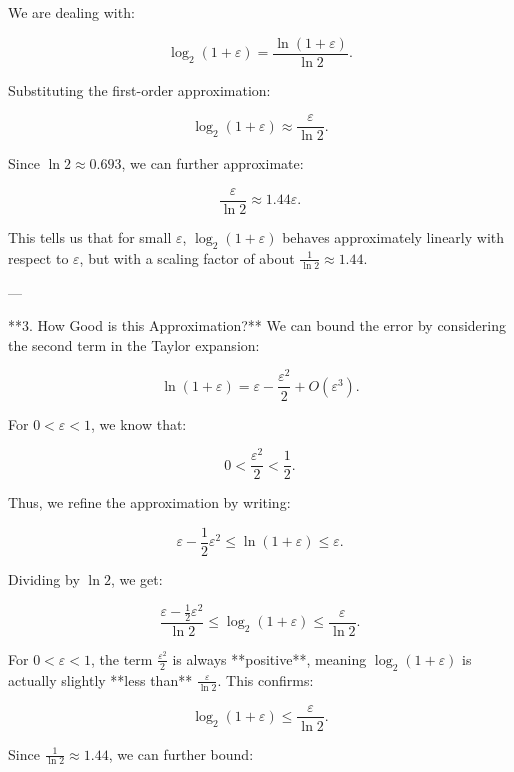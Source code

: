 {       We are dealing with:
       
       \[
       \log_2(1+\varepsilon) = \frac{\ln(1+\varepsilon)}{\ln 2}.
       \]
       
       Substituting the first-order approximation:
       
       \[
       \log_2(1+\varepsilon) \approx \frac{\varepsilon}{\ln 2}.
       \]
       
       Since \( \ln 2 \approx 0.693 \), we can further approximate:
       
       \[
       \frac{\varepsilon}{\ln 2} \approx 1.44 \varepsilon.
       \]
       
       This tells us that for small \( \varepsilon \), \( \log_2(1+\varepsilon) \) behaves approximately linearly with respect to \( \varepsilon \), but with a scaling factor of about \( \frac{1}{\ln 2} \approx 1.44 \).
       
       ---
       
         **3. How Good is this Approximation?**
       We can bound the error by considering the second term in the Taylor expansion:
       
       \[
       \ln(1+\varepsilon) = \varepsilon - \frac{\varepsilon^2}{2} + O(\varepsilon^3).
       \]
       
       For \( 0 < \varepsilon < 1 \), we know that:
       
       \[
       0 < \frac{\varepsilon^2}{2} < \frac{1}{2}.
       \]
       
       Thus, we refine the approximation by writing:
       
       \[
       \varepsilon - \frac{1}{2} \varepsilon^2 \leq \ln(1+\varepsilon) \leq \varepsilon.
       \]
       
       Dividing by \( \ln 2 \), we get:
       
       \[
       \frac{\varepsilon - \frac{1}{2} \varepsilon^2}{\ln 2} \leq \log_2(1+\varepsilon) \leq \frac{\varepsilon}{\ln 2}.
       \]
       
       For \( 0 < \varepsilon < 1 \), the term \( \frac{\varepsilon^2}{2} \) is always **positive**, meaning \( \log_2(1+\varepsilon) \) is actually slightly **less than** \( \frac{\varepsilon}{\ln 2} \). This confirms:
       
       \[
       \log_2(1+\varepsilon) \leq \frac{\varepsilon}{\ln 2}.
       \]
       
       Since \( \frac{1}{\ln 2} \approx 1.44 \), we can further bound:
       
}
